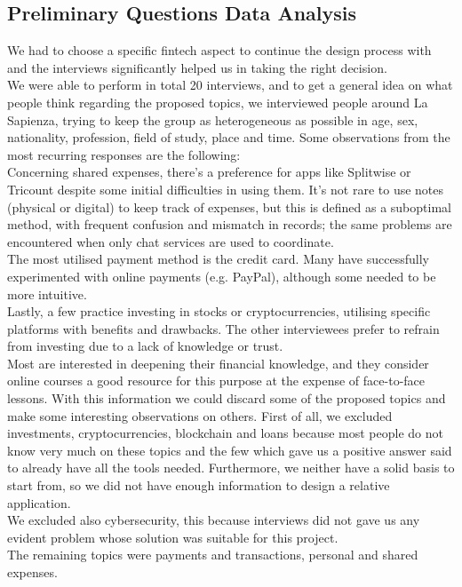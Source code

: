 \subsection{Preliminary Questions Data Analysis}
We had to choose a specific fintech aspect to continue the design process with and the interviews significantly helped us in taking the right decision.\\
We were able to perform in total 20 interviews, and to get a general idea on what people think regarding the proposed topics, we interviewed people around La Sapienza, trying to keep the group as heterogeneous as possible in age, sex, nationality, profession, field of study, place and time.
Some observations from the most recurring responses are the following:\\
Concerning shared expenses, there's a preference for apps like Splitwise or Tricount despite some initial difficulties in using them. It’s not rare to use notes (physical or digital) to keep track of expenses, but this is defined as a suboptimal method, with frequent confusion and mismatch in records; the same problems are encountered when only chat services are used to coordinate.\\
The most utilised payment method is the credit card. Many have successfully experimented with online payments (e.g. PayPal), although some needed to be more intuitive. \\
Lastly, a few practice investing in stocks or cryptocurrencies, utilising specific platforms with benefits and drawbacks. The other interviewees prefer to refrain from investing due to a lack of knowledge or trust.\\
Most are interested in deepening their financial knowledge, and they consider online courses a good resource for this purpose at the expense of face-to-face lessons.
With this information we could discard some of the proposed topics and make some interesting observations on others.
First of all, we excluded investments, cryptocurrencies, blockchain and loans because most people do not know very much on these topics and the few which gave us a positive answer said to already have all the tools needed. Furthermore, we neither have a solid basis to start from, so we did not have enough information to design a relative application.\\
We excluded also cybersecurity, this because interviews did not gave us any evident problem whose solution was suitable for this project.\\
The remaining topics were payments and transactions, personal and shared expenses.
